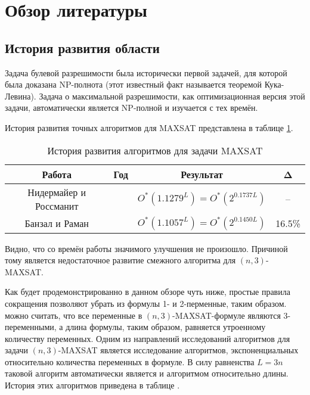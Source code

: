 
\section{Обзор литературы}
\label{sec:literature-review}

\subsection{История развития области}
\label{subsec:literature-review:history}

\firstpar{}Задача булевой разрешимости была исторически первой задачей, для которой была доказана NP-полнота (этот известный факт называется теоремой Кука-Левина). Задача о максимальной разрешимости, как оптимизационная версия этой задачи, автоматически является NP-полной и изучается с тех времён.

История развития точных алгоритмов для MAXSAT представлена в таблице \ref{table:maxsat-length-research}.

\begin{table}[ht]
 \caption{История развития алгоритмов для задачи MAXSAT}
 \centering
 \begin{tabular}{|c|c|c|c|}
  \hline
  \textbf{Работа} & \textbf{Год} & \textbf{Результат} & \textbf{Δ} \\
  \hline
  Нидермайер и Россманит \cite{niedermeier1999new} & \citeyear{niedermeier1999new} & $O^*(1.1279^L) = O^*(2^{0.1737L})$ & -- \\
  Банзал и Раман \cite{bansal99} & \citeyear{bansal99} & $O^*(1.1057^L) = O^*(2^{0.1450L})$ & 16.5\% \\
  \hline
 \end{tabular}
 \label{table:maxsat-length-research}
\end{table}

Видно, что со времён работы \cite{bansal99} значимого улучшения не произошло. Причиной тому является недостаточное развитие смежного алгоритма для $(n,3)$-MAXSAT.

Как будет продемонстрированно в данном обзоре чуть ниже, простые правила сокращения позволяют убрать из формулы 1- и 2-перменные, таким образом. можно считать, что все переменные в $(n,3)$-MAXSAT-формуле являются 3-переменными, а длина формулы, таким образом, равняется утроенному количеству переменных. Одним из направлений исследований алгоритмов для задачи $(n,3)$-MAXSAT является исследование алгоритмов, экспоненциальных относительно количества переменных в формуле. В силу равненства $L = 3n$ таковой алгоритм автоматически является и алгоритмом относительно длины. История этих алгоритмов приведена в таблице \label{table:n3-maxsat-research}.

